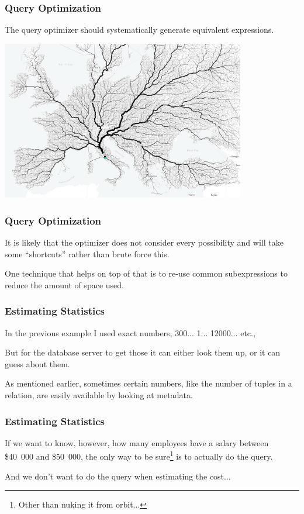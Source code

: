 \begin{frame}
\frametitle{Query Optimization}
The query optimizer should systematically generate equivalent expressions.

\begin{center}
	\includegraphics[width=0.8\textwidth]{images/lead-to-rome.jpg}
\end{center}


\end{frame}

\begin{frame}
\frametitle{Query Optimization}

It is likely that the optimizer does not consider every possibility and will take some ``shortcuts'' rather than brute force this. 

One technique that helps on top of that is to re-use common subexpressions to reduce the amount of space used.


\end{frame}

\begin{frame}
\frametitle{Estimating Statistics}

In the previous example I used exact numbers, 300... 1... 12000... etc.,

But for the database server to get those it can either look them up, or it can guess about them. 

As mentioned earlier, sometimes certain numbers, like the number of tuples in a relation, are easily available by looking at metadata. 

\end{frame}

\begin{frame}
\frametitle{Estimating Statistics}


If we want to know, however, how many employees have a salary between \$40~000 and \$50~000, the only way to be sure\footnote{Other than nuking it from orbit...} is to actually do the query.

And we don't want to do the query when estimating the cost...

\end{frame}


